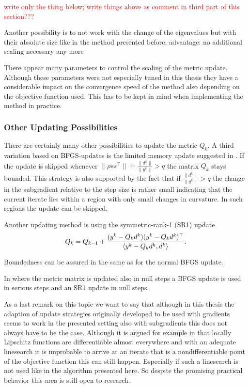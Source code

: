 \textcolor{red}{write only the thing below; write things above as comment in third part of this section???}

Another possibility is to not work with the change of the eigenvalues but with their absolute size like in the method presented before;  advantage: no additional scaling necessary any more

\begin{remark}
	There appear many parameters to control the scaling of the metric update. Although these parameters were not especially tuned in this thesis they have a considerable impact on the convergence speed of the method also depending on the objective function used. This has to be kept in mind when implementing the method in practice.
\end{remark}

\subsubsection{Other Updating Possibilities}

There are certainly many other possibilities to update the metric \(Q_k\). A third variation based on BFGS-updates is the limited memory update suggested in \cite{Nocedal1980}. If the update is skipped whenever \(\|\rho ss^{\top}\| = \frac{\|d^k\|}{\|y^k\|}> q\) the matrix \(Q_k\) stays bounded. This strategy is also supported by the fact that if \(\frac{\|d^k\|}{\|y^k\|}> q\) the change in the subgradient relative to the step size
is rather small indicating that the current iterate lies within a region with only small changes in curvature. In such regions the update can be skipped.

Another updating method is using the symmetric-rank-1 (SR1) update
\[ Q_k = Q_{k-1}+\frac{(y^k-Q_kd^k)(y^k-Q_kd^k)^{\top}}{\left\langle y^k-Q_kd^k,d^k \right\rangle}. \]

Boundedness can be assured in the same as for the normal BFGS update.

In \cite{Haarala2007} where the metric matrix is updated also in null steps a BFGS update is used in serious steps and an SR1 update in null steps. 

As a last remark on this topic we want to say that although in this thesis the adaption of update strategies originally developed to be used with gradients seems to work in the presented setting also with subgradients this does not always have to be the case.
Although it is argued for example in \cite{Lewis2009} that locally Lipschitz functions are differentiable almost everywhere and with an adequate linesearch it is improbable to arrive at an iterate that is a nondifferentiable point of the objective function this can still happen. Especially if such a linesearch is not used like in the algorithm presented here.
So despite the promising practical behavior this area is still open to research.

